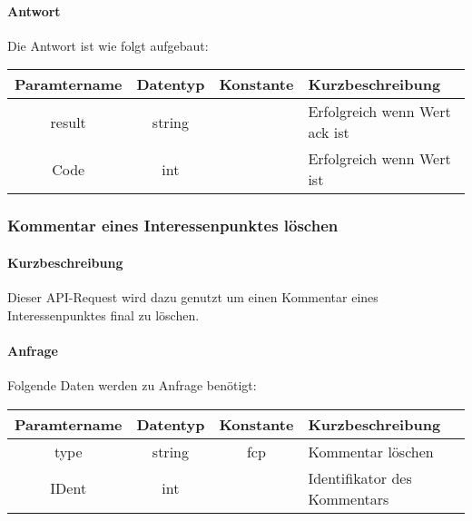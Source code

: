 \paragraph{Antwort}Die Antwort ist wie folgt aufgebaut:
\begin{table}[H]
	\begin{tabular}{|c|c|c|p{6.5cm}|}
		\hline
		\textbf{Paramtername} & \textbf{Datentyp} & \textbf{Konstante} & \textbf{Kurzbeschreibung}                                                                                               \\ \hline
		result              & string           &                 & Erfolgreich wenn Wert {\glqq ack\grqq} ist \\ \hline
		Code                & int              &                 & Erfolgreich wenn Wert {\glqq 0\grqq} ist \\ \hline
	\end{tabular}
\end{table}
\subsubsection{Kommentar eines Interessenpunktes löschen}
\paragraph{Kurzbeschreibung}Dieser API-Request wird dazu genutzt um einen Kommentar eines Interessenpunktes final zu löschen.
\paragraph{Anfrage}Folgende Daten werden zu Anfrage benötigt:
\begin{table}[H]
	\begin{tabular}{|c|c|c|p{6.5cm}|}
		\hline
		\textbf{Paramtername} & \textbf{Datentyp} & \textbf{Konstante} & \textbf{Kurzbeschreibung}                                                                                               \\ \hline
		type                & string            & fcp                & Kommentar löschen \\ \hline
		IDent               & int               &                    & Identifikator des Kommentars \\ \hline
	\end{tabular}
\end{table}
